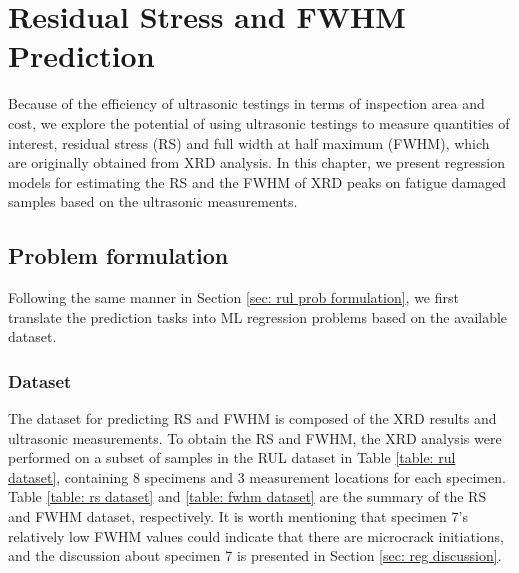 \chapter{Residual Stress and FWHM Prediction}
\label{chap: reg}

Because of the efficiency of ultrasonic testings in terms of inspection area and cost, we explore the potential of using ultrasonic testings to measure quantities of interest, residual stress (RS) and full width at half maximum (FWHM), which are originally obtained from XRD analysis. In this chapter, we present regression models for estimating the RS and the FWHM of XRD peaks on fatigue damaged samples based on the ultrasonic measurements. 

\section{Problem formulation}
Following the same manner in Section \ref{sec: rul prob formulation}, we first translate the prediction tasks into ML regression problems based on the available dataset.

\subsection{Dataset}
The dataset for predicting RS and FWHM is composed of the XRD results and ultrasonic measurements. To obtain the RS and FWHM, the XRD analysis were performed on a subset of samples in the RUL dataset in Table \ref{table: rul dataset}, containing 8 specimens and 3 measurement locations for each specimen. Table \ref{table: rs dataset} and \ref{table: fwhm dataset} are the summary of the RS and FWHM dataset, respectively. It is worth mentioning that specimen 7's relatively low FWHM values could indicate that there are microcrack initiations, and the discussion about specimen 7 is presented in Section \ref{sec: reg discussion}.

